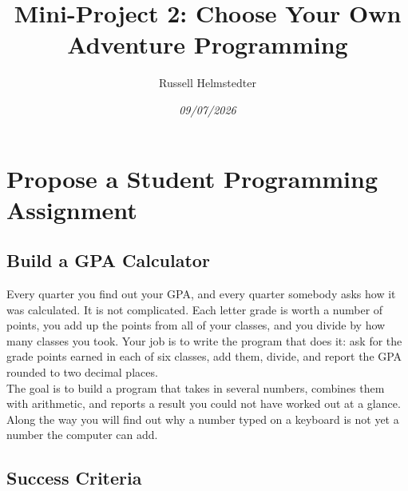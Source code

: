 \documentclass[11pt]{article}
\author{Russell Helmstedter}
\date{\textit{09/07/2026}}
\title{Mini-Project 2: Choose Your Own Adventure Programming}
\begin{document}
\maketitle
\tableofcontents

\section{Propose a Student Programming Assignment}
\label{sec:orgba8adb4}
\subsection{Build a GPA Calculator}
\label{sec:org07d9bf0}

Every quarter you find out your GPA, and every quarter somebody asks how it was calculated. It is not complicated. Each letter grade is worth a number of points, you add up the points from all of your classes, and you divide by how many classes you took. Your job is to write the program that does it: ask for the grade points earned in each of six classes, add them, divide, and report the GPA rounded to two decimal places.\\

The goal is to build a program that takes in several numbers, combines them with arithmetic, and reports a result you could not have worked out at a glance. Along the way you will find out why a number typed on a keyboard is not yet a number the computer can add.\\
\subsection{Success Criteria}
\label{sec:org099166a}
\end{document}
